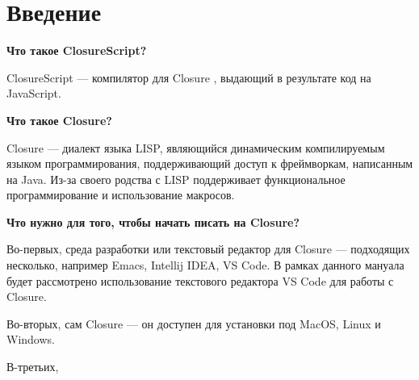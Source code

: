 \chapter*{Введение}


\textbf{Что такое ClosureScript?}

ClosureScript \cite{closurescript} --- компилятор для Closure \cite{closure}, выдающий в результате код на JavaScript.

\textbf{Что такое Closure?}

Closure --- диалект языка LISP, являющийся динамическим компилируемым языком программирования, поддерживающий доступ к фреймворкам, написанным на Java. Из-за своего родства с LISP поддерживает функциональное программирование и использование макросов.

\textbf{Что нужно для  того, чтобы начать писать на Closure?}

Во-первых, среда разработки или текстовый редактор для Closure ---  подходящих несколько, например Emacs, 	Intellij IDEA, VS Code. В рамках данного мануала будет рассмотрено использование текстового редактора VS Code для работы с Closure.

Во-вторых, сам Closure --- он доступен для установки под MacOS, Linux и  Windows.

В-третьих, 
